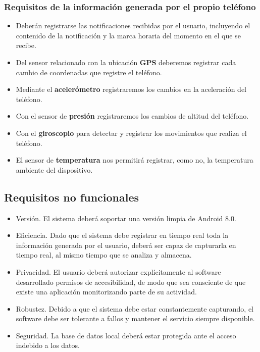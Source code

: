 \documentclass[12pt,a4paper,oneside]{book} %
\begin{document}
\subsubsection{Requisitos de la información generada por el propio teléfono}
\begin{itemize}
  \item Deberán registrarse las notificaciones recibidas por el usuario, incluyendo el contenido de la notificación y la marca horaria del momento en el que se recibe.
  \item Del sensor relacionado con la ubicación \textbf{GPS} deberemos registrar cada cambio de coordenadas que registre el teléfono. 
  \item Mediante el \textbf{acelerómetro} registraremos los cambios en la aceleración del teléfono. 
  \item Con el sensor de \textbf{presión} registraremos los cambios de altitud del teléfono. 
  \item Con el \textbf{giroscopio} para detectar y registrar  los movimientos que realiza el teléfono. 
  \item El sensor de \textbf{temperatura} nos permitirá registrar, como no, la temperatura ambiente del dispositivo. 
\end{itemize}
\subsection{Requisitos no funcionales}
\begin{itemize}
	\item Versión. El sistema deberá soportar una versión limpia de Android 8.0. 
	\item Eficiencia. Dado que el sistema debe registrar en tiempo real toda la información generada por el usuario, deberá ser capaz de capturarla en tiempo real, al mismo tiempo que se analiza y almacena. 
	\item Privacidad. El usuario deberá autorizar explícitamente al software desarrollado permisos de accesibilidad, de modo que sea consciente de que existe una aplicación monitorizando parte de su actividad.
	\item Robustez. Debido a que el sistema debe estar constantemente capturando, el software debe ser tolerante a fallos y mantener el servicio siempre disponible.  
	\item Seguridad. La base de datos local deberá estar protegida ante el acceso indebido a los datos. 
\end{itemize}
\end{document}
